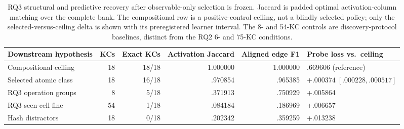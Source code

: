 \begin{table}[t]
  \centering
  \small
  \begin{tabular}{@{}lrrrrl@{}}
    \toprule
    Downstream hypothesis & KCs & Exact \kstar{} KCs &
      Activation Jaccard & Aligned edge F1 & Probe loss vs.\ ceiling \\
    \midrule
    Compositional ceiling & 18 & 18/18 & 1.000000 & 1.000000 & .669606 (reference) \\
    Selected atomic class & 18 & 16/18 & .970854 & .965385 &
      $+.000374\;[.000228,.000517]$ \\
    RQ3 operation groups & 8 & 5/18 & .371913 & .750929 & +.005864 \\
    RQ3 seen-cell fine & 54 & 1/18 & .084184 & .186969 & +.006657 \\
    Hash distractors & 18 & 0/18 & .202342 & .359259 & +.013238 \\
    \bottomrule
  \end{tabular}
  \caption{RQ3 structural and predictive recovery after observable-only
  selection is frozen.  Jaccard is padded optimal activation-column matching
  over the complete bank.  The compositional row is a positive-control ceiling,
  not a blindly selected policy; only the selected-versus-ceiling delta is
  shown with its preregistered learner interval.  The 8- and 54-KC controls are
  discovery-protocol baselines, distinct from the RQ2 6- and 75-KC conditions.}
  \label{tab:discovery-results}
\end{table}
